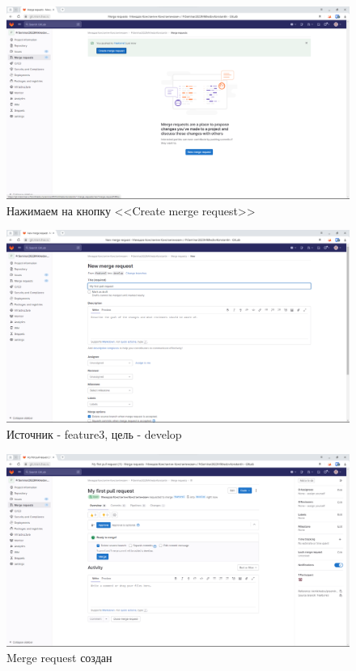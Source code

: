 \documentclass[a4paper]{article}
\begin{document}
  \begin{figure}[H]
    \centering
    \includegraphics[width=\textwidth]{1_ (23)}
    \caption{Нажимаем на кнопку <<Create merge request>>}
  \end{figure}

  \begin{figure}[H]
    \centering
    \includegraphics[width=\textwidth]{1_ (22)}
    \caption{Источник - feature3, цель - develop}
  \end{figure}

  \begin{figure}[H]
    \centering
    \includegraphics[width=\textwidth]{1_ (21)}
    \caption{Merge request создан}
  \end{figure}
\end{document}

